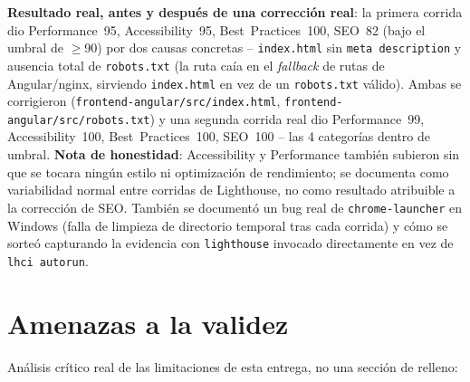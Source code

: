 \documentclass[12pt,a4paper]{article}
\begin{document}
\textbf{Resultado real, antes y después de una corrección real}: la
primera corrida dio Performance~95, Accessibility~95, Best~Practices~100,
SEO~82 (bajo el umbral de $\geq$90) por dos causas concretas --
\texttt{index.html} sin \texttt{meta description} y ausencia total de
\texttt{robots.txt} (la ruta caía en el \emph{fallback} de rutas de
Angular/nginx, sirviendo \texttt{index.html} en vez de un
\texttt{robots.txt} válido). Ambas se corrigieron
(\texttt{frontend-angular/src/index.html},
\texttt{frontend-angular/src/robots.txt}) y una segunda corrida real dio
Performance~99, Accessibility~100, Best~Practices~100, SEO~100 -- las 4
categorías dentro de umbral. \textbf{Nota de honestidad}: Accessibility y
Performance también subieron sin que se tocara ningún estilo ni
optimización de rendimiento; se documenta como variabilidad normal entre
corridas de Lighthouse, no como resultado atribuible a la corrección de
SEO. También se documentó un bug real de \texttt{chrome-launcher} en
Windows (falla de limpieza de directorio temporal tras cada corrida) y
cómo se sorteó capturando la evidencia con \texttt{lighthouse} invocado
directamente en vez de \texttt{lhci autorun}.

\section{Amenazas a la validez}
\label{sec:amenazas}

Análisis crítico real de las limitaciones de esta entrega, no una
sección de relleno:
\end{document}
